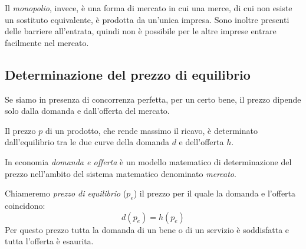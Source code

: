 \vspace{.5em}
Il \emph{monopolio}, invece, è una forma di mercato in cui una merce, di cui 
non esiste un sostituto equivalente, è prodotta da un'unica impresa.
Sono inoltre presenti delle barriere all'entrata, quindi non è possibile per 
le altre imprese entrare facilmente nel mercato. 


\subsection{Determinazione del prezzo di equilibrio}

Se siamo in presenza di concorrenza perfetta, per un certo bene, il prezzo 
dipende solo dalla domanda e dall'offerta del mercato.

Il prezzo \(p\) di un prodotto, che rende massimo il ricavo, è determinato 
dall'equilibrio tra le due curve della domanda \(d\) e dell'offerta \(h\). 

In economia \emph{domanda e offerta} è un modello matematico di 
determinazione del prezzo nell'ambito del sistema 
matematico denominato \emph{mercato}.

Chiameremo \emph{prezzo di equilibrio} (\(p_e\)) il prezzo per il quale la 
domanda e l'offerta coincidono:
\[d(p_e) = h(p_e)\]
Per questo prezzo tutta la domanda di un bene o di un servizio è soddisfatta 
e tutta l'offerta è esaurita.




